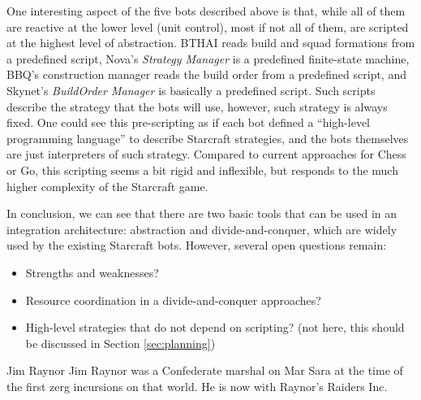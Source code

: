 \documentclass[journal]{IEEEtran}
\begin{document}
One interesting aspect of the five bots described above is that, while all of them are reactive at the lower level (unit control), most if not all of them, are scripted at the highest level of abstraction. BTHAI reads build and squad formations from a predefined script, Nova's {\em Strategy Manager} is a predefined finite-state machine, BBQ's construction manager reads the build order from a predefined script, and Skynet's {\em BuildOrder Manager} is basically a predefined script. Such scripts describe the strategy that the bots will use, however, such strategy is always fixed. One could see this pre-scripting as if each bot defined a ``high-level programming language'' to describe Starcraft strategies, and the bots themselves are just interpreters of such strategy. Compared to current approaches for Chess or Go, this scripting seems a bit rigid and inflexible, but responds to the much higher complexity of the Starcraft game.

In conclusion, we can see that there are two basic tools that can be used in an integration architecture: abstraction and divide-and-conquer, which are widely used by the existing Starcraft bots. However, several open questions remain:

{\color{blue}
\begin{itemize}
\item Strengths and weaknesses?
\item Resource coordination in a divide-and-conquer approaches?
\item High-level strategies that do not depend on scripting? (not here, this should be discussed in Section \ref{sec:planning})
\end{itemize}
}



\ifCLASSOPTIONcaptionsoff
  \newpage
\fi

                                                    



\begin{IEEEbiography}{Jim Raynor}
Jim Raynor was a Confederate marshal on Mar Sara at the time of the first zerg incursions on that world. He is now with Raynor's Raiders Inc.
\end{IEEEbiography}
\end{document}
